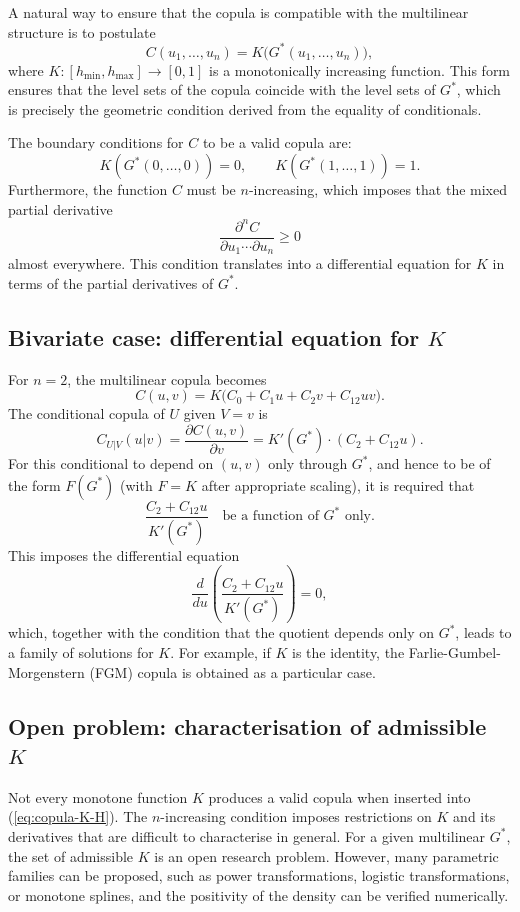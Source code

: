 A natural way to ensure that the copula is compatible with the multilinear structure is to postulate
\begin{equation}
C(u_1,\ldots,u_n) = K\bigl(G^*(u_1,\ldots,u_n)\bigr),
\label{eq:copula-K-H}
\end{equation}
where \(K:[h_{\min},h_{\max}]\to[0,1]\) is a monotonically increasing function. This form ensures that the level sets of the copula coincide with the level sets of \(G^*\), which is precisely the geometric condition derived from the equality of conditionals.

The boundary conditions for \(C\) to be a valid copula are:
\[
K(G^*(0,\ldots,0)) = 0,\qquad K(G^*(1,\ldots,1)) = 1.
\]
Furthermore, the function \(C\) must be \(n\)-increasing, which imposes that the mixed partial derivative
\[
\frac{\partial^n C}{\partial u_1\cdots\partial u_n} \ge 0
\]
almost everywhere. This condition translates into a differential equation for \(K\) in terms of the partial derivatives of \(G^*\).

\subsection{Bivariate case: differential equation for \(K\)}

For \(n=2\), the multilinear copula becomes
\[
C(u,v) = K\bigl(C_0 + C_1 u + C_2 v + C_{12} uv\bigr).
\]
The conditional copula of \(U\) given \(V=v\) is
\[
C_{U|V}(u|v) = \frac{\partial C(u,v)}{\partial v} = K'(G^*) \cdot (C_2 + C_{12} u).
\]
For this conditional to depend on \((u,v)\) only through \(G^*\), and hence to be of the form \(F(G^*)\) (with \(F=K\) after appropriate scaling), it is required that
\[
\frac{C_2 + C_{12} u}{K'(G^*)} \quad \text{be a function of } G^* \text{ only}.
\]
This imposes the differential equation
\[
\frac{d}{du}\left(\frac{C_2 + C_{12} u}{K'(G^*)}\right) = 0,
\]
which, together with the condition that the quotient depends only on \(G^*\), leads to a family of solutions for \(K\). For example, if \(K\) is the identity, the Farlie-Gumbel-Morgenstern (FGM) copula is obtained as a particular case.

\subsection{Open problem: characterisation of admissible \(K\)}

Not every monotone function \(K\) produces a valid copula when inserted into (\ref{eq:copula-K-H}). The \(n\)-increasing condition imposes restrictions on \(K\) and its derivatives that are difficult to characterise in general. For a given multilinear \(G^*\), the set of admissible \(K\) is an open research problem. However, many parametric families can be proposed, such as power transformations, logistic transformations, or monotone splines, and the positivity of the density can be verified numerically.

